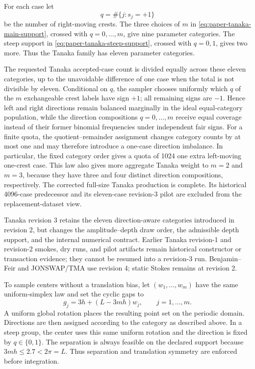 For each case let
\begin{equation}
  q=\#\{j:s_j=+1\}
  \label{eq:paper-tanaka-right-count}
\end{equation}
be the number of right-moving crests.  The three choices of $m$ in
\cref{eq:paper-tanaka-main-support}, crossed with
$q=0,\ldots,m$, give nine parameter categories.  The steep support in
\cref{eq:paper-tanaka-steep-support}, crossed with $q=0,1$, gives two more.
Thus the Tanaka family has eleven parameter categories.

The requested Tanaka accepted-case count is divided equally across these
eleven categories, up to the unavoidable difference of one case when the
total is not divisible by eleven.  Conditional on $q$, the sampler chooses
uniformly which $q$ of the $m$ exchangeable crest labels have sign $+1$; all
remaining signs are $-1$.  Hence left and right directions remain balanced
marginally in the ideal equal-category population, while the direction
compositions $q=0,\ldots,m$ receive equal coverage instead of their former
binomial frequencies under independent fair signs.  For a finite quota, the
quotient--remainder assignment changes category counts by at most one and may
therefore introduce a one-case direction imbalance.  In particular, the
fixed category order gives a quota of 1024 one extra left-moving one-crest
case.  This law also gives more aggregate Tanaka weight to
$m=2$ and $m=3$, because they have three and four distinct direction
compositions, respectively.  The corrected full-size Tanaka production is
complete.  Its historical 4096-case predecessor and its eleven-case
revision-3 pilot are excluded from the replacement-dataset view.

Tanaka revision 3 retains the eleven direction-aware categories introduced in
revision 2, but changes the amplitude--depth draw order, the admissible depth
support, and the internal numerical contract.  Earlier Tanaka revision-1 and
revision-2 smokes, dry runs, and pilot artifacts remain historical
constructor or transaction evidence; they cannot be resumed into a
revision-3 run.  Benjamin--Feir and JONSWAP/TMA use revision 4; static Stokes
remains at revision 2.

To sample centers without a translation bias, let
$(w_1,\ldots,w_m)$ have the same uniform-simplex law and set the cyclic gaps
to
\begin{equation}
  g_j=3h+(L-3mh)w_j,\qquad j=1,\ldots,m.
  \label{eq:paper-tanaka-gap-law}
\end{equation}
A uniform global rotation places the resulting point set on the periodic
domain.  Directions are then assigned according to the category as described
above.  In a steep group, the center uses this same uniform rotation and the
direction is fixed by $q\in\{0,1\}$.  The separation is always feasible on
the declared support because $3mh\leq2.7<2\pi=L$.  Thus separation and
translation symmetry are enforced before integration.

